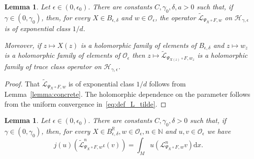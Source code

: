 \documentclass[10pt]{amsart}
\newtheorem{lemm}[theo]{Lemma}\newtheorem{prop}[theo]{Proposition}\newtheorem{coro}[theo]{Corollary}\newtheorem{conj}[theo]{Conjecture}
\theoremstyle{definition}\newtheorem{defi}[theo]{Definition}\newtheorem{rema}[theo]{Remark}\newtheorem{exam}[theo]{Example}\newtheorem{exem}[theo]{Example}\newtheorem{nota}[theo]{Notation}
\newcommand{\p}[1]{\left(#1\right)}
\newcommand{\clO}{\mathcal{O}}
\newcommand{\clL}{\mathcal{L}}
\newcommand{\clH}{\mathcal{H}}
\newcommand{\bbN}{\mathbb{N}}
\newcommand{\bbR}{\mathbb{R}}
\newcommand{\rmd}{\mathrm{d}}
\begin{document}
\begin{lemm}\label{lemma:properties_operator}
Let $\epsilon \in (0,\epsilon_0)$. There are constants $C,\gamma_0,\delta,a > 0$ such that, if $\gamma \in (0,\gamma_0)$, then, for every $X \in B_{\epsilon,\delta}$ and $w \in \clO_\epsilon$, the operator $\widetilde{\clL}_{\Psi_X \circ F,w}$ on $\clH_{\gamma,\epsilon}$ is of exponential class $1/d$.

Moreover, if $z \mapsto X(z)$ is a holomorphic family of elements of $B_{\epsilon,\delta}$ and $z \mapsto w_z$ is a holomorphic family of elements of $\clO_\epsilon$ then $z \mapsto \widetilde{\clL}_{\Psi_{X(z)} \circ F,w_z}$ is a holomorphic family of trace class operator on $\clH_{\gamma,\epsilon}$.
\end{lemm}

\begin{proof}
That $\widetilde{\clL}_{\Psi_X \circ F,w}$ is of exponential class $1/d$ follows from Lemma~\ref{lemma:concrete}. The holomorphic dependence on the parameter follows from the uniform convergence in~\eqref{eq:def_L_tilde}.
\end{proof}

\begin{lemm}\label{lemma:integrals_and_operators}
Let $\epsilon \in (0,\epsilon_0)$. There are constants $C,\gamma_0,\delta > 0$ such that, if $\gamma \in (0,\gamma_0)$, then, for every $X \in B_{\epsilon,\delta}^{\bbR},w \in \clO_\epsilon, n \in \bbN$ and $u,v \in \clO_\epsilon$ we have
\begin{equation}\label{eq:natural_inclusion}
j(u)\p{\widetilde{\clL}_{\Psi_X \circ F,w}^n \iota(v)} = \int_M u \left(\clL^n_{\Psi_X \circ F,w}v\right) \rmd x.
\end{equation}
\end{lemm}
\end{document}
